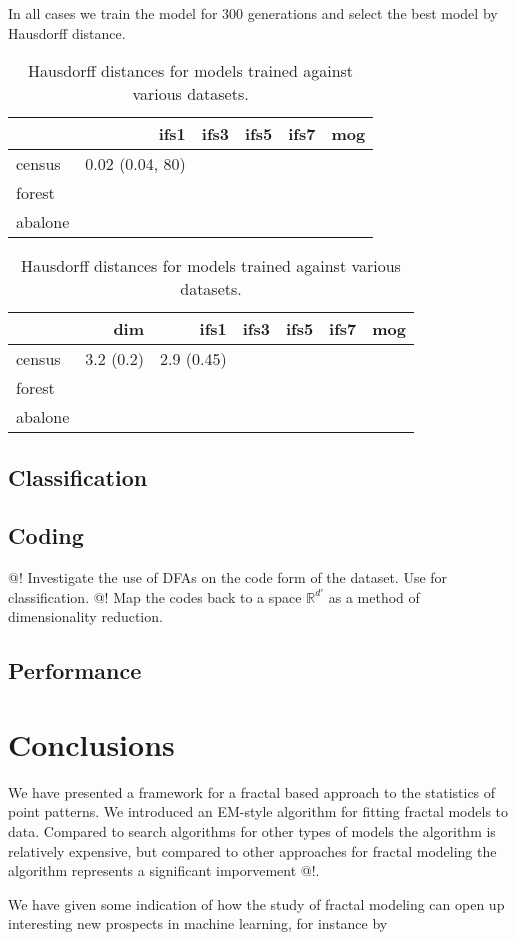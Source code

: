 \documentclass[11pt]{article}
\theoremstyle{definition}
\begin{document}
In all cases we train the model for 300 generations and select the best model by Hausdorff distance. 

\begin{table}
\begin{tabular}{l | r r r r | r |}
\hline
 & ifs1 & ifs3 & ifs5 & ifs7 & mog \\
\hline
census & 0.02 (0.04, 80) & & & & \\
forest & & & & & \\
abalone & & & & & \\
\hline

\end{tabular}
\caption{Hausdorff distances for models trained against various datasets.}
\label{tablelabel}
\end{table}

\begin{table}
\begin{tabular}{l | r r r r r | r |}
\hline
  & dim & ifs1 & ifs3 & ifs5 & ifs7 & mog \\
\hline
census & 3.2 (0.2) & 2.9 (0.45) & & & & \\
forest &  & & & & & \\
abalone & &  & & & & \\
\hline

\end{tabular}
\caption{Hausdorff distances for models trained against various datasets.}
\label{tablelabel}
\end{table}

\subsection{Classification}

\subsection{Coding}

@! Investigate the use of DFAs on the code form of the dataset. Use for classification.
@! Map the codes back to a space ${\mathbb R}^{d'}$ as a method of dimensionality reduction. 

\subsection{Performance}

\section{Conclusions}

We have presented a framework for a fractal based approach to the statistics of point patterns. We introduced an EM-style algorithm for fitting fractal models to data. Compared to search algorithms for other types of models the algorithm is relatively expensive, but compared to other approaches for fractal modeling the algorithm represents a significant imporvement @!. 

We have given some indication of how the study of fractal modeling can open up interesting new prospects in machine learning, for instance by 
\end{document}
